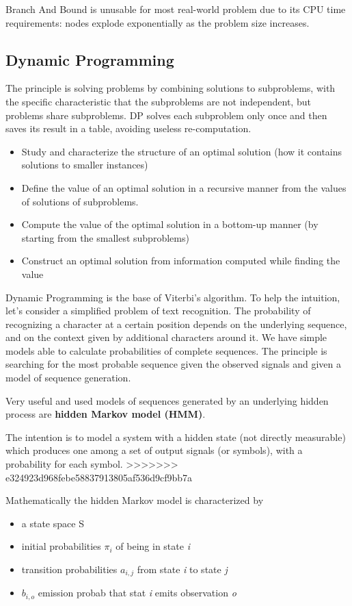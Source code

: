 \documentclass[10pt]{article}
\begin{document}
Branch And Bound is unusable for most real-world problem due to its CPU time requirements: nodes explode exponentially as the problem size increases.

\subsection{Dynamic Programming}
The principle is solving problems by combining solutions to subproblems, with the specific characteristic that the subproblems are not independent, but problems share subproblems. DP solves each subproblem only once and then saves its result in a table, avoiding useless re-computation.

\begin{itemize}
\item Study and characterize the structure of an optimal solution (how it contains solutions to smaller instances)
\item Define the value of an optimal solution in a recursive manner from the values of solutions of subproblems.
\item Compute the value of the optimal solution in a bottom-up manner (by starting from the smallest subproblems)
\item Construct an optimal solution from information computed while finding the value
\end{itemize}

Dynamic Programming is the base of Viterbi's algorithm. To help the intuition, let’s consider a simplified problem of text recognition.
The probability of recognizing a character at a certain position depends on the underlying sequence, and on the context given by additional characters around it. 
We have simple models able to calculate probabilities of complete sequences. The principle is searching for the most probable sequence given the observed signals and given a model of sequence generation.

Very useful and used models of sequences generated by an underlying hidden process are \textbf{hidden Markov model (HMM)}.

The intention is to model a system with a hidden state (not directly measurable) which produces one among a set of output signals (or symbols), with a probability for each symbol. 
>>>>>>> e324923d968febe58837913805af536d9cf9bb7a

Mathematically the hidden Markov model is characterized by 
\begin{itemize}
\item a state space S
\item initial probabilities $ \pi_i $  of being in state \textit{i}
\item transition probabilities $ a_{i,j} $ from state \textit{i} to state \textit{j}
\item $ b_{i,o} $ emission probab that stat \textit{i} emits observation \textit{o}
\end{itemize}
\end{document}
